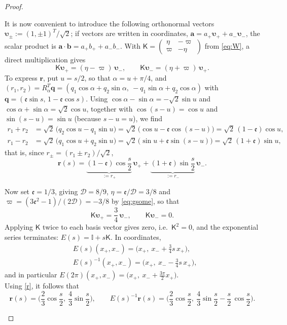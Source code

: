 \documentclass[reqno]{amsart}
\newcommand{\D}{\mathcal{D}}
\newcommand{\ee}{\mathfrak{e}}
\begin{document}
\begin{proof}
\begin{enumerate}
\begin{itemize}
It is now convenient to introduce the following orthonormal vectors $\boldsymbol{\upsilon}_\pm:=(1,\pm1)^T/\sqrt2$; if vectors are written in coordinates, $\mathbf a=a_+\boldsymbol{\upsilon}_++a_-\boldsymbol{\upsilon}_-$, the scalar product is $\mathbf a\cdot\mathbf b=a_+b_++a_-b_-$. With $\mathsf K=\left(\begin{smallmatrix}\eta&-\varpi\\ \varpi&-\eta\end{smallmatrix}\right)$ from \eqref{eq:W}, a direct multiplication gives
\[
\mathsf K\boldsymbol{\upsilon}_+=(\eta-\varpi)\,\boldsymbol{\upsilon}_-,\qquad \mathsf K\boldsymbol{\upsilon}_-=(\eta+\varpi)\,\boldsymbol{\upsilon}_+ .
\]
To express $\mathbf r$, put $u=s/2$, so that $\alpha=u+\pi/4$, and $(r_1,r_2)=R_\alpha^T\mathbf q=(q_1\cos\alpha+q_2\sin\alpha,\ -q_1\sin\alpha+q_2\cos\alpha)$ with $\mathbf q=(\ee\sin s,\,1-\ee\cos s)$. Using $\cos\alpha-\sin\alpha=-\sqrt2\sin u$ and $\cos\alpha+\sin\alpha=\sqrt2\cos u$, together with $\cos(s-u)=\cos u$ and $\sin(s-u)=\sin u$ (because $s-u=u$), we find
\[
\begin{aligned}
r_1+r_2&=\sqrt2\,\big(q_2\cos u-q_1\sin u\big)=\sqrt2\,\big(\cos u-\ee\cos(s-u)\big)=\sqrt2\,(1-\ee)\cos u,\\
r_1-r_2&=\sqrt2\,\big(q_1\cos u+q_2\sin u\big)=\sqrt2\,\big(\sin u+\ee\sin(s-u)\big)=\sqrt2\,(1+\ee)\sin u,
\end{aligned}
\]
that is, since $r_\pm=(r_1\pm r_2)/\sqrt2$,
\begin{equation}
    \label{r}
\mathbf r(s)=\underbrace{(1-\ee)\cos\frac{s}{2}}_{:=r_+}\,\boldsymbol{\upsilon}_++\underbrace{(1+\ee)\sin\frac{s}{2}}_{:=r_-}\,\boldsymbol{\upsilon}_- .
\end{equation}

Now set $\ee=1/3$, giving $\D=8/9$, $\eta=\ee/\D=3/8$ and $\varpi=(3\ee^2-1)/(2\D)=-3/8$ by \eqref{eq:gsome}, so that
\[
\mathsf K\boldsymbol{\upsilon}_+=\frac{3}{4}\,\boldsymbol{\upsilon}_-,\qquad \mathsf K\boldsymbol{\upsilon}_-=0 .
\]
Applying $\mathsf K$ twice to each basis vector gives zero, i.e.\ $\mathsf K^2=0$, and the exponential series terminates: $E(s)=\mathbb I+s\mathsf K$. In coordinates,
\begin{equation}
    \begin{aligned}
        &E(s)(x_+,x_-)=\big(x_+,\ x_-+\frac{3}{4} s\,x_+\big),\\
&E(s)^{-1}(x_+,x_-)=\big(x_+,\ x_--\frac{3}{4} s\,x_+\big),
    \end{aligned}
\end{equation}
and in particular $E(2\pi)(x_+,x_-)=\big(x_+,\ x_-+\frac{3\pi}{2}x_+\big)$. \\
Using \eqref{r}, it follows that
\[
\mathbf r(s)=\Big(\frac{2}{3}\cos\frac{s}{2},\ \frac{4}{3}\sin\frac{s}{2}\Big),\qquad
E(s)^{-1}\mathbf r(s)=\Big(\frac{2}{3}\cos\frac{s}{2},\ \frac{4}{3}\sin\frac{s}{2}-\frac{s}{2}\,\cos\frac{s}{2}\Big).
\]


\end{itemize}
\end{enumerate}
\end{proof}
\end{document}
